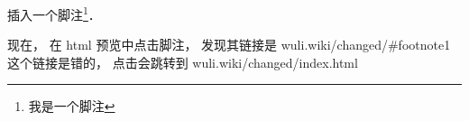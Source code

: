 
插入一个脚注\footnote{我是一个脚注}．

现在， 在 html 预览中点击脚注， 发现其链接是 wuli.wiki/changed/#footnote1 这个链接是错的， 点击会跳转到 wuli.wiki/changed/index.html
